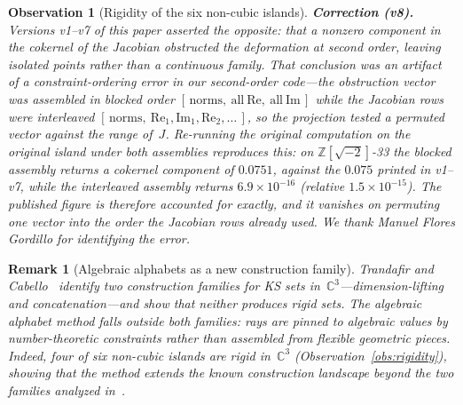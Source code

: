 \documentclass[12pt,a4paper]{article}
\newtheorem{observation}[theorem]{Observation}
\newtheorem{remark}[theorem]{Remark}
\newcommand{\C}{\mathbb{C}}
\newcommand{\Z}{\mathbb{Z}}
\begin{document}
\begin{observation}[Rigidity of the six non-cubic islands]
\smallskip\noindent\textbf{Correction (v8).}  Versions v1--v7 of this paper asserted the opposite: that a nonzero component in the cokernel of the Jacobian obstructed the deformation at second order, leaving isolated points rather than a continuous family.  That conclusion was an artifact of a constraint-ordering error in our second-order code---the obstruction vector was assembled in blocked order $[\,\mathrm{norms},\ \mathrm{all\ Re},\ \mathrm{all\ Im}\,]$ while the Jacobian rows were interleaved $[\,\mathrm{norms},\ \mathrm{Re}_1, \mathrm{Im}_1, \mathrm{Re}_2, \ldots\,]$, so the projection tested a permuted vector against the range of~$J$.  Re-running the original computation on the original island under both assemblies reproduces this: on $\Z[\sqrt{-2}]$-33 the blocked assembly returns a cokernel component of $0.0751$, against the $0.075$ printed in v1--v7, while the interleaved assembly returns $6.9\times10^{-16}$ (relative $1.5\times10^{-15}$).  The published figure is therefore accounted for exactly, and it vanishes on permuting one vector into the order the Jacobian rows already used.  We thank Manuel Flores Gordillo for identifying the error.
\end{observation}

\begin{remark}[Algebraic alphabets as a new construction family]\label{rem:new-construction}
Trandafir and Cabello~\cite{TrandafirCabello2025} identify two construction families for KS sets in~$\C^3$---dimension-lifting and concatenation---and show that neither produces rigid sets.  The algebraic alphabet method falls outside both families: rays are pinned to algebraic values by number-theoretic constraints rather than assembled from flexible geometric pieces.  Indeed, four of six non-cubic islands are rigid in~$\C^3$ (Observation~\ref{obs:rigidity}), showing that the method extends the known construction landscape beyond the two families analyzed in~\cite{TrandafirCabello2025}.
\end{remark}
\end{document}
